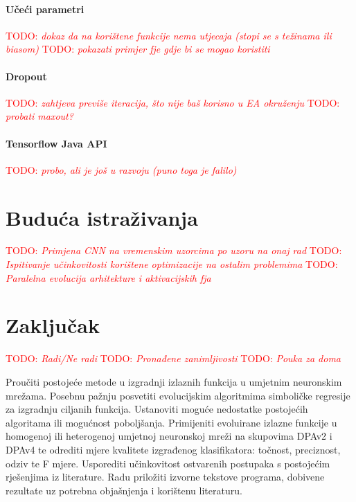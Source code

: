 \documentclass[times, utf8, numeric, diplomski]{fer}
\def\TODO#1{\noindent\textcolor{red}{TODO: \textit{#1}}\newline}
\def\todo#1{\TODO{#1}}
\begin{document}
\subsubsection{Učeći parametri}
\todo{dokaz da na korištene funkcije nema utjecaja (stopi se s težinama ili biasom)}
\todo{pokazati primjer fje gdje bi se mogao koristiti}

\subsubsection{Dropout}
\todo{zahtjeva previše iteracija, što nije baš korisno u EA okruženju}
\todo{probati maxout?}

\subsubsection{Tensorflow Java API}
\todo{probo, ali je još u razvoju (puno toga je falilo)}

\chapter{Buduća istraživanja}
\todo{Primjena CNN na vremenskim uzorcima po uzoru na onaj rad}
\todo{Ispitivanje učinkovitosti korištene optimizacije na ostalim problemima}
\todo{Paralelna evolucija arhitekture i aktivacijskih fja \citep{cnn_evolution}}

\chapter{Zaključak}
\todo{Radi/Ne radi}
\todo{Pronađene zanimljivosti}
\todo{Pouka za doma}




\begin{sazetak}
Proučiti postojeće metode u izgradnji izlaznih funkcija u umjetnim neuronskim mrežama. Posebnu pažnju posvetiti evolucijskim algoritmima simboličke regresije za izgradnju ciljanih funkcija. Ustanoviti moguće nedostatke postojećih algoritama ili mogućnost poboljšanja. Primijeniti evoluirane izlazne funkcije u homogenoj ili heterogenoj umjetnoj neuronskoj mreži na skupovima DPAv2 i DPAv4 te odrediti mjere kvalitete izgrađenog klasifikatora: točnost, preciznost, odziv te F mjere. Usporediti učinkovitost ostvarenih postupaka s postojećim rješenjima iz literature. Radu priložiti izvorne tekstove programa, dobivene rezultate uz potrebna objašnjenja i korištenu literaturu.

\end{sazetak}
\end{document}
